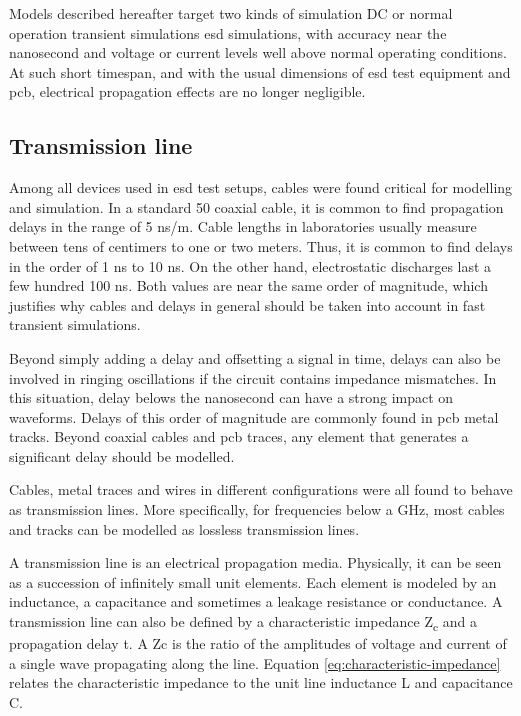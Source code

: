 Models described hereafter target two kinds of simulation
DC or normal operation transient simulations
\gls{esd} simulations, with accuracy near the nanosecond and voltage or current levels well above normal operating conditions.
At such short timespan, and with the usual dimensions of \gls{esd} test equipment and \gls{pcb}, electrical propagation effects are no longer negligible.


\subsection{Transmission line}


Among all devices used in \gls{esd} test setups, cables were found critical for modelling and simulation.
In a standard 50\textOmega{} coaxial cable, it is common to find propagation delays in the range of 5 ns/m.
Cable lengths in laboratories usually measure between tens of centimers to one or two meters.
Thus, it is common to find delays in the order of 1 ns to 10 ns.
On the other hand, electrostatic discharges last a few hundred 100 ns.
Both values are near the same order of magnitude, which justifies why cables and delays in general should be taken into account in fast transient simulations.

Beyond simply adding a delay and offsetting a signal in time, delays can also be involved in ringing oscillations if the circuit contains impedance mismatches.
In this situation, delay belows the nanosecond can have a strong impact on waveforms.
Delays of this order of magnitude are commonly found in \gls{pcb} metal tracks.
Beyond coaxial cables and \gls{pcb} traces, any element that generates a significant delay should be modelled.

Cables, metal traces and wires in different configurations were all found to behave as transmission lines.
More specifically, for frequencies below a GHz, most cables and tracks can be modelled as lossless transmission lines.

A transmission line is an electrical propagation media.
Physically, it can be seen as a succession of infinitely small unit elements.
Each element is modeled by an inductance, a capacitance and sometimes a leakage resistance or conductance.
A transmission line can also be defined by a characteristic impedance Z\textsubscript{c} and a propagation delay \textDelta{}t.
A \gls{Zc} is the ratio of the amplitudes of voltage and current of a single wave propagating along the line.
Equation \ref{eq:characteristic-impedance} relates the characteristic impedance to the unit line inductance \textdelta{}L and capacitance \textdelta{}C.

